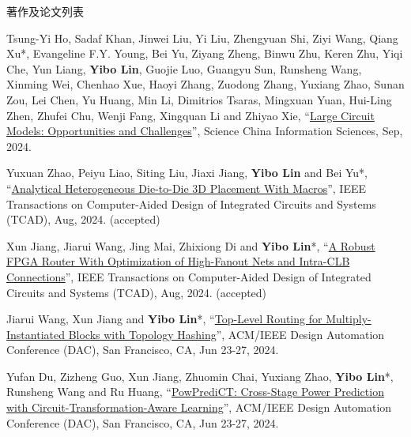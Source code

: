 \begin{rSection}{著作及论文列表}
\begin{description}[font=\normalfont, rightmargin=2em]
{}
            

\item[{[J158]}]{
        Tsung-Yi Ho, Sadaf Khan, Jinwei Liu, Yi Liu, Zhengyuan Shi, Ziyi Wang, Qiang Xu*, Evangeline F.Y. Young, Bei Yu, Ziyang Zheng, Binwu Zhu, Keren Zhu, Yiqi Che, Yun Liang, \textbf{Yibo Lin}, Guojie Luo, Guangyu Sun, Runsheng Wang, Xinming Wei, Chenhao Xue, Haoyi Zhang, Zuodong Zhang, Yuxiang Zhao, Sunan Zou, Lei Chen, Yu Huang, Min Li, Dimitrios Tsaras, Mingxuan Yuan, Hui-Ling Zhen, Zhufei Chu, Wenji Fang, Xingquan Li and Zhiyao Xie, 
    ``\href{https://doi.org/10.1007/s11432-024-4155-7}{Large Circuit Models: Opportunities and Challenges}'', 
    Science China Information Sciences, Sep, 2024.
    
}
            

\item[{[J157]}]{
        Yuxuan Zhao, Peiyu Liao, Siting Liu, Jiaxi Jiang, \textbf{Yibo Lin} and Bei Yu*, 
    ``\href{https://doi.org/10.1109/TCAD.2024.3444716}{Analytical Heterogeneous Die-to-Die 3D Placement With Macros}'', 
    IEEE Transactions on Computer-Aided Design of Integrated Circuits and Systems (TCAD), Aug, 2024.
    (accepted)
}
            

\item[{[J156]}]{
        Xun Jiang, Jiarui Wang, Jing Mai, Zhixiong Di and \textbf{Yibo Lin}*, 
    ``\href{https://doi.org/10.1109/TCAD.2024.3447218}{A Robust FPGA Router With Optimization of High-Fanout Nets and Intra-CLB Connections}'', 
    IEEE Transactions on Computer-Aided Design of Integrated Circuits and Systems (TCAD), Aug, 2024.
    (accepted)
}
            

\item[{[C155]}]{
        Jiarui Wang, Xun Jiang and \textbf{Yibo Lin}*, 
    ``\href{https://doi.org/10.1145/3649329.3655900}{Top-Level Routing for Multiply-Instantiated Blocks with Topology Hashing}'', 
    ACM/IEEE Design Automation Conference (DAC), San Francisco, CA, Jun 23-27, 2024.
    
}
            

\item[{[C154]}]{
        Yufan Du, Zizheng Guo, Xun Jiang, Zhuomin Chai, Yuxiang Zhao, \textbf{Yibo Lin}*, Runsheng Wang and Ru Huang, 
    ``\href{https://doi.org/10.1145/3649329.3657349}{PowPrediCT: Cross-Stage Power Prediction with Circuit-Transformation-Aware Learning}'', 
    ACM/IEEE Design Automation Conference (DAC), San Francisco, CA, Jun 23-27, 2024.
    
}
            


\end{description}
\end{rSection}
